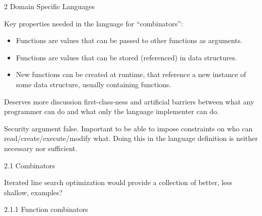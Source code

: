 \documentclass[12pt]{PalisadesLakesBook}
\begin{document}
\begin{plSection}{2 Domain Specific Languages}
\begin{description}
Key properties needed in the language for ``combinators'':
\begin{itemize}
\item Functions are values that can be passed to other functions
as arguments.
\item Functions are values that can be stored (referenced)
in data structures.
\item New functions can be created at runtime, that reference
a new instance of some data structure,
usually containing functions.
\end{itemize}
\end{description}

Deserves more discussion first-class-ness and artificial barriers
between what any programmer can do and what only
the language implementer can do.

Security argument false. 
Important to be able to impose constraints on
who can read/create/execute/modify what. 
Doing this in the language definition
is neither necessary nor sufficient.
\begin{plSection}{2.1 Combinators}

Iterated line search optimization would provide 
a collection of better, less shallow, 
examples?

\begin{plSection}{2.1.1 Function combinators}


\end{plSection}
\end{plSection}
\end{plSection}
\end{document}
